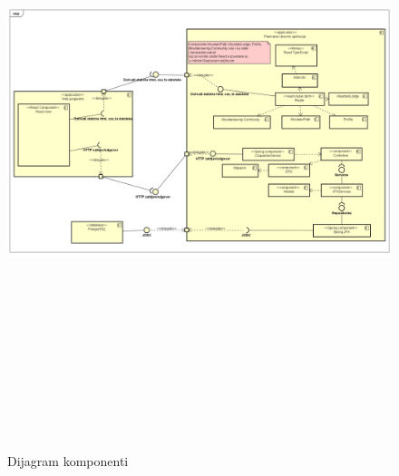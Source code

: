 		\begin{figure}[H]
			\includegraphics[scale=0.4, height=185mm, width=175mm]{dijagrami/dijagram-komponenti.png} %
			\centering
			\caption{Dijagram komponenti}
			\label{fig:dijagrami-komponenti.png}
		\end{figure}
		
		\eject